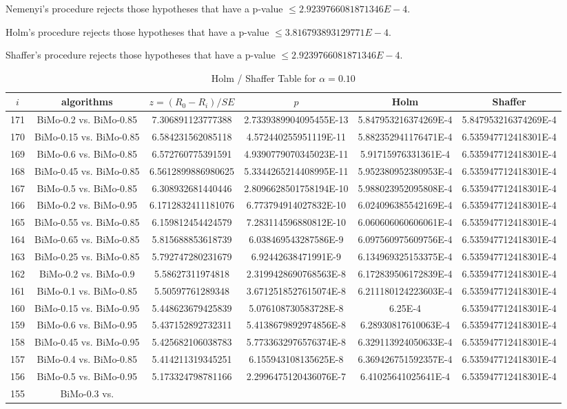 \documentclass[a4paper,10pt]{article}
\begin{document}
\begin{landscape}
\begin{table}[!htp]
\begin{tabular}{cccccc}
\end{tabular}
\end{table}
Nemenyi's procedure rejects those hypotheses that have a p-value $\le2.9239766081871346E-4$.


Holm's procedure rejects those hypotheses that have a p-value $\le3.816793893129771E-4$.


Shaffer's procedure rejects those hypotheses that have a p-value $\le2.9239766081871346E-4$.


\begin{table}[!htp]
\centering\tiny
\caption{Holm / Shaffer Table for $\alpha=0.10$}
\begin{tabular}{cccccc}
$i$&algorithms&$z=(R_0 - R_i)/SE$&$p$&Holm&Shaffer\\
\hline
171&BiMo-0.2 vs. BiMo-0.85&7.306891123777388&2.7339389904095455E-13&5.847953216374269E-4&5.847953216374269E-4\\170&BiMo-0.15 vs. BiMo-0.85&6.584231562085118&4.572440255951119E-11&5.882352941176471E-4&6.535947712418301E-4\\169&BiMo-0.6 vs. BiMo-0.85&6.572760775391591&4.9390779070345023E-11&5.91715976331361E-4&6.535947712418301E-4\\168&BiMo-0.45 vs. BiMo-0.85&6.5612899886980625&5.3344265214408995E-11&5.952380952380953E-4&6.535947712418301E-4\\167&BiMo-0.5 vs. BiMo-0.85&6.308932681440446&2.8096628501758194E-10&5.988023952095808E-4&6.535947712418301E-4\\166&BiMo-0.2 vs. BiMo-0.95&6.1712832411181076&6.773794914027832E-10&6.024096385542169E-4&6.535947712418301E-4\\165&BiMo-0.55 vs. BiMo-0.85&6.159812454424579&7.283114596880812E-10&6.060606060606061E-4&6.535947712418301E-4\\164&BiMo-0.65 vs. BiMo-0.85&5.815688853618739&6.038469543287586E-9&6.097560975609756E-4&6.535947712418301E-4\\163&BiMo-0.25 vs. BiMo-0.85&5.792747280231679&6.92442638471991E-9&6.134969325153375E-4&6.535947712418301E-4\\162&BiMo-0.2 vs. BiMo-0.9&5.58627311974818&2.3199428690768563E-8&6.172839506172839E-4&6.535947712418301E-4\\161&BiMo-0.1 vs. BiMo-0.85&5.50597761289348&3.6712518527615074E-8&6.211180124223603E-4&6.535947712418301E-4\\160&BiMo-0.15 vs. BiMo-0.95&5.448623679425839&5.076108730583728E-8&6.25E-4&6.535947712418301E-4\\159&BiMo-0.6 vs. BiMo-0.95&5.437152892732311&5.4138679892974856E-8&6.28930817610063E-4&6.535947712418301E-4\\158&BiMo-0.45 vs. BiMo-0.95&5.425682106038783&5.7733632976576374E-8&6.329113924050633E-4&6.535947712418301E-4\\157&BiMo-0.4 vs. BiMo-0.85&5.414211319345251&6.155943108135625E-8&6.369426751592357E-4&6.535947712418301E-4\\156&BiMo-0.5 vs. BiMo-0.95&5.173324798781166&2.2996475120436076E-7&6.41025641025641E-4&6.535947712418301E-4\\155&BiMo-0.3 vs. 
\end{tabular}
\end{table}
\end{landscape}
\end{document}
